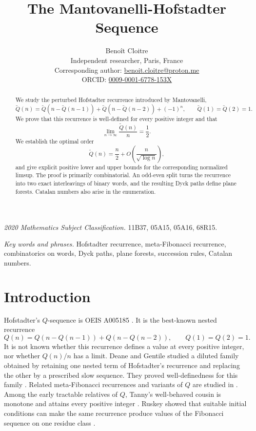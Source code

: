 \documentclass[11pt]{article}
\title{The Mantovanelli-Hofstadter Sequence}
\author{Beno\^it Cloitre\\
\small Independent researcher, Paris, France\\
\small Corresponding author: \href{mailto:benoit.cloitre@proton.me}{benoit.cloitre@proton.me}\\
\small ORCID: \href{https://orcid.org/0009-0001-6778-153X}{0009-0001-6778-153X}}
\date{}
\theoremstyle{definition}
\theoremstyle{remark}
\newcommand{\Qt}{\widetilde Q}
\begin{document}
\maketitle

\begin{abstract}
We study the perturbed Hofstadter recurrence introduced by Mantovanelli,
\[
 \Qt(n)=\Qt(n-\Qt(n-1))+\Qt(n-\Qt(n-2))+(-1)^n,
 \qquad \Qt(1)=\Qt(2)=1.
\]
We prove that this recurrence is well-defined for every positive integer and
that
\[
 \lim_{n\to\infty}\frac{\Qt(n)}n=\frac12.
\]
We establish the optimal order
\[
 \Qt(n)=\frac n2+O\!\left(\frac{n}{\sqrt{\log n}}\right),
\]
and give explicit positive lower and upper bounds for the corresponding
normalized limsup.  The proof is primarily combinatorial.  An odd-even split
turns the recurrence into two exact interleavings of binary words, and the
resulting Dyck paths define plane forests.  Catalan numbers also arise in the
enumeration.
\end{abstract}

\medskip
\noindent\textit{2020 Mathematics Subject Classification.}
11B37, 05A15, 05A16, 68R15.

\noindent\textit{Key words and phrases.}
Hofstadter recurrence, meta-Fibonacci recurrence, combinatorics on words,
Dyck paths, plane forests, succession rules, Catalan numbers.

\section{Introduction}

Hofstadter's \(Q\)-sequence is OEIS A005185 \cite{Hofstadter79,OEIS}.  It is
the best-known nested recurrence
\[
 Q(n)=Q(n-Q(n-1))+Q(n-Q(n-2)),
 \qquad Q(1)=Q(2)=1.
\]
It is not known whether this recurrence defines a value at every positive
integer, nor whether \(Q(n)/n\) has a limit.  Deane and Gentile studied a
diluted family obtained by retaining one nested term of Hofstadter's
recurrence and replacing the other by a prescribed slow sequence.  They
proved well-definedness for this family \cite{DeaneGentile25}.  Related
meta-Fibonacci recurrences and variants of \(Q\) are studied in
\cite{AFA17,Alkan18,BKT07,Stoll09,Fox17}.
Among the early tractable relatives of \(Q\), Tanny's well-behaved cousin is
monotone and attains every positive integer \cite{Tanny92}.
Ruskey showed that suitable initial conditions can make the same recurrence
produce values of the Fibonacci sequence on one residue class
\cite{Ruskey11}.
\end{document}
